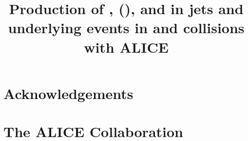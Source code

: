 \documentclass[ALICE,manyauthors]{cernphprep}
\begin{document}


\begin{titlepage}

\title{Production of \kzero, \lmb (\almb), \Xis and \Oms in jets and underlying events in \pp and \pPb collisions with ALICE}



\end{titlepage}

\setcounter{page}{2} %







\newenvironment{acknowledgement}{\relax}{\relax}
\begin{acknowledgement}
\section*{Acknowledgements}
%
\end{acknowledgement}



\newpage
\appendix

%
%

\section{The ALICE Collaboration}
\label{app:collab}
%  
\end{document}
